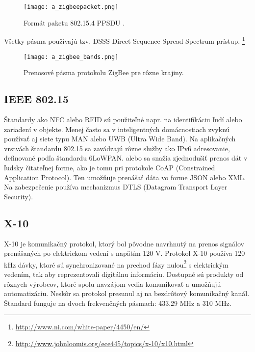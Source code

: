 \documentclass[12pt,a4paper,oneside,openright]{report}
\begin{document}
\begin{figure*}[h]
	\centering
	\texttt{[image: a\_zigbeepacket.png]}
	\caption{Formát paketu 802.15.4 PPSDU \cite{zigbeepacket}.}
	\label{f:o_zigbee_packet}
\end{figure*}

Všetky pásma používajú tzv. DSSS Direct Sequence Spread Spectrum prístup. \footnote{\url{http://www.ni.com/white-paper/4450/en/}}
\begin{figure*}[h]
	\centering
	\texttt{[image: a\_zigbee\_bands.png]}
	\caption{Prenosové pásma protokolu ZigBee pre rôzne krajiny. \cite{zigbeebands}}
	\label{f:o_zigbee_bands}
\end{figure*}


\subsection{IEEE 802.15}
Štandardy ako NFC alebo RFID sú použiteľné napr. na identifikáciu ľudí alebo zariadení v objekte. Menej často sa v inteligentných domácnostiach zvyknú používať aj siete typu MAN alebo UWB (Ultra Wide Band).
Na aplikačných vrstvách štandardu 802.15 sa zavádzajú rôzne služby ako IPv6 adresovanie, definované podľa štandardu 6LoWPAN. alebo sa snažia zjednodušiť prenos dát v ľudsky čitateľnej forme, ako je tomu pri protokole CoAP (Constrained Application Protocol). Ten umožňuje prenášať dáta vo forme JSON alebo XML. Na zabezpečenie používa mechanizmus DTLS (Datagram Transport Layer Security).

\subsection{X-10}
X-10 je komunikačný protokol, ktorý bol pôvodne navrhnutý na prenos signálov prenášaných po elektrickom vedení s napätím 120 V. Protokol X-10 používa 120 kHz dávky, ktoré sú synchronizované na prechod fázy nulou\footnote{\url{http://www.johnloomis.org/ece445/topics/x-10/x10.html}} s elektrickým vedením, tak aby reprezentovali digitálnu informáciu. Dostupné sú produkty od rôznych výrobcov, ktoré spolu navzájom vedia komunikovať a umožňujú automatizáciu.\cite{x10mi}
Neskôr sa protokol presunul aj na bezdrôtový komunikačný kanál. Štandard funguje na dvoch frekvenčných pásmach: 433.29 MHz a 310 MHz. \cite{x10freq}
\end{document}
